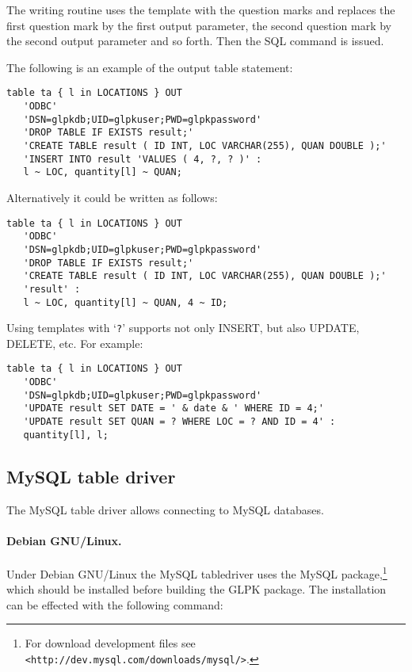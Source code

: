 \documentclass[10pt]{article}
\begin{document}
The writing routine uses the template with the question marks and
replaces the first question mark by the first output parameter, the
second question mark by the second output parameter and so forth. Then
the SQL command is issued.

The following is an example of the output table statement:

\begin{small}
\begin{verbatim}
table ta { l in LOCATIONS } OUT
   'ODBC'
   'DSN=glpkdb;UID=glpkuser;PWD=glpkpassword'
   'DROP TABLE IF EXISTS result;'
   'CREATE TABLE result ( ID INT, LOC VARCHAR(255), QUAN DOUBLE );'
   'INSERT INTO result 'VALUES ( 4, ?, ? )' :
   l ~ LOC, quantity[l] ~ QUAN;
\end{verbatim}
\end{small}

\noindent
Alternatively it could be written as follows:

\begin{small}
\begin{verbatim}
table ta { l in LOCATIONS } OUT
   'ODBC'
   'DSN=glpkdb;UID=glpkuser;PWD=glpkpassword'
   'DROP TABLE IF EXISTS result;'
   'CREATE TABLE result ( ID INT, LOC VARCHAR(255), QUAN DOUBLE );'
   'result' :
   l ~ LOC, quantity[l] ~ QUAN, 4 ~ ID;
\end{verbatim}
\end{small}

Using templates with `\verb|?|' supports not only INSERT, but also
UPDATE, DELETE, etc. For example:

\begin{small}
\begin{verbatim}
table ta { l in LOCATIONS } OUT
   'ODBC'
   'DSN=glpkdb;UID=glpkuser;PWD=glpkpassword'
   'UPDATE result SET DATE = ' & date & ' WHERE ID = 4;'
   'UPDATE result SET QUAN = ? WHERE LOC = ? AND ID = 4' :
   quantity[l], l;
\end{verbatim}
\end{small}

\subsection{MySQL table driver}

The MySQL table driver allows connecting to MySQL databases.

\paragraph{Debian GNU/Linux.}
Under Debian GNU/Linux the MySQL table\linebreak driver uses the MySQL
package,\footnote{For download development files see
{\tt<http://dev.mysql.com/downloads/mysql/>}.} which should be installed
before building the GLPK package. The installation can be effected with
the following command:
\end{document}
